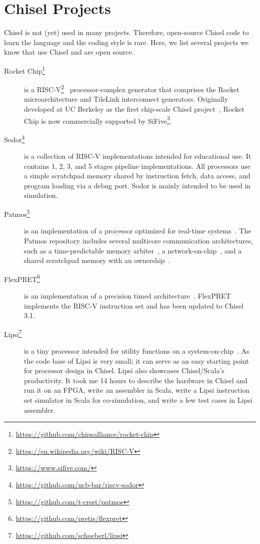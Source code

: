 \documentclass[%
    10pt,
    headinclude, footinclude=false,
    openright, %
    notitlepage,
    cleardoublepage=empty,
    headsepline,
    numbers=noenddot,
    bibliography=totoc, index=totoc,
    ]{scrbook}
\newcommand{\myref}[2]{\href{#1}{#2}}
\renewcommand{\myref}[2]{{#2}{\footnote{\url{#1}}}}
\begin{document}
\chapter{Chisel Projects}


Chisel is not (yet) used in many projects. Therefore, open-source Chisel code
to learn the language and the coding style is rare. Here, we list several projects
we know that use Chisel and are open source.

\begin{description}

\item[\myref{https://github.com/chipsalliance/rocket-chip}{Rocket Chip}]
is a \myref{https://en.wikipedia.org/wiki/RISC-V}{RISC-V}~\cite{risc-v}
processor-complex generator that comprises the Rocket
microarchitecture and TileLink interconnect generators.  Originally developed
at UC Berkeley as the first chip-scale Chisel project~\cite{rocket:techrep}, Rocket Chip is now
commercially supported by \myref{https://www.sifive.com/}{SiFive}.

\item[\myref{https://github.com/ucb-bar/riscv-sodor}{Sodor}] is a collection of RISC-V
implementations intended for educational use. It contains 1, 2, 3, and 5 stages pipeline
implementations. All processors use a simple scratchpad memory shared by instruction
fetch, data access, and program loading via a debug port. Sodor is mainly intended to
be used in simulation.

\item[\myref{https://github.com/t-crest/patmos}{Patmos}] is an implementation of a
processor optimized for real-time systems~\cite{patmos:rts2018}. The Patmos repository
includes several multicore communication architectures, such as a time-predictable memory
arbiter~\cite{t-crest:memnoc}, a network-on-chip~\cite{s4nocni:arcs2019}, and
a shared scratchpad memory with an ownership~\cite{t-crest:ownspm}.

\item[\myref{https://github.com/pretis/flexpret}{FlexPRET}] is an implementation of a
precision timed architecture~\cite{Zimmer:EECS-2015-181}. FlexPRET implements
the RISC-V instruction set and has been updated to Chisel 3.1.

\item[\myref{https://github.com/schoeberl/lipsi}{Lipsi}] is a tiny processor intended
for utility functions on a system-on-chip~\cite{lipsi:arcs2018}. As the code base of
Lipsi is very small; it can serve as an easy starting point for processor design in Chisel.
Lipsi also showcases Chisel/Scala's productivity. It took me 14 hours to describe the
hardware in Chisel and run it on an FPGA, write an assembler in Scala, write a
Lipsi instruction set simulator in Scala for co-simulation, and write a few test cases
in Lipsi assembler.



\end{description}
\end{document}
